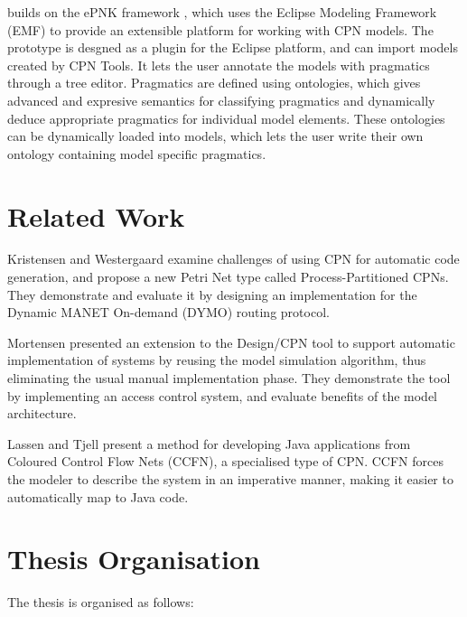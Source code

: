 \thename{} builds on the ePNK framework \cite{kindler2011epnk}, which uses the
Eclipse Modeling Framework (EMF) to provide an extensible platform for working
with CPN models. The prototype is desgned as a plugin for the Eclipse platform,
and can import models created by CPN Tools. It lets the user annotate the models
with pragmatics through a tree editor. Pragmatics are defined using ontologies,
which gives advanced and expresive semantics for classifying pragmatics and
dynamically deduce appropriate pragmatics for individual model elements. These
ontologies can be dynamically loaded into models, which lets the user write
their own ontology containing model specific pragmatics.

\section{Related Work}

Kristensen and Westergaard \cite{kristensen2010automatic} examine challenges of
using CPN for automatic code generation, and propose a new Petri Net type called
Process-Partitioned CPNs. They demonstrate and evaluate it by
designing an implementation for the Dynamic MANET On-demand (DYMO) routing
protocol.

Mortensen \cite{mortensen2000automatic} presented an extension to the Design/CPN
tool to support automatic implementation of systems by reusing the model
simulation algorithm, thus eliminating the usual manual implementation phase.
They demonstrate the tool by implementing an access control system, and
evaluate benefits of the model architecture.

Lassen and Tjell \cite{lassen2010automatic}  present a method for developing
Java applications from Coloured Control Flow Nets (CCFN), a specialised type of
CPN. CCFN forces the modeler to describe the system in an
imperative manner, making it easier to automatically map to Java code.

\section{Thesis Organisation}
The thesis is organised as follows:

